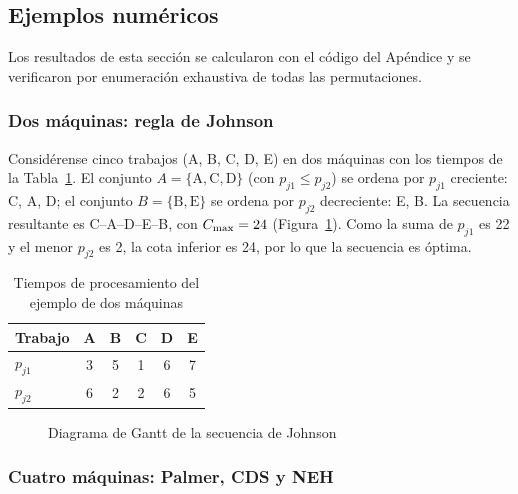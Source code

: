 \subsection{Ejemplos numéricos}

Los resultados de esta sección se calcularon con el código del Apéndice y se verificaron
por enumeración exhaustiva de todas las permutaciones.

\subsubsection{Dos máquinas: regla de Johnson}

Considérense cinco trabajos (A, B, C, D, E) en dos máquinas con los tiempos de la
Tabla~\ref{tab:johnson}. El conjunto $A=\{\text{A},\text{C},\text{D}\}$ (con
$p_{j1}\le p_{j2}$) se ordena por $p_{j1}$ creciente: C, A, D; el conjunto
$B=\{\text{B},\text{E}\}$ se ordena por $p_{j2}$ decreciente: E, B. La secuencia resultante
es C--A--D--E--B, con $C_{\max}=24$ (Figura~\ref{fig:johnson}). Como la suma de $p_{j1}$ es
22 y el menor $p_{j2}$ es 2, la cota inferior es 24, por lo que la secuencia es óptima.

\begin{table}[htbp]
\caption{Tiempos de procesamiento del ejemplo de dos máquinas}\label{tab:johnson}
\centering
\begin{tabular}{@{}lccccc@{}}
\toprule
Trabajo & A & B & C & D & E \\
\midrule
$p_{j1}$ & 3 & 5 & 1 & 6 & 7 \\
$p_{j2}$ & 6 & 2 & 2 & 6 & 5 \\
\bottomrule
\end{tabular}
\end{table}

\begin{figure}[htbp]
\caption{Diagrama de Gantt de la secuencia de Johnson}\label{fig:johnson}
\centering
{}
\end{figure}

\subsubsection{Cuatro máquinas: Palmer, CDS y NEH}

